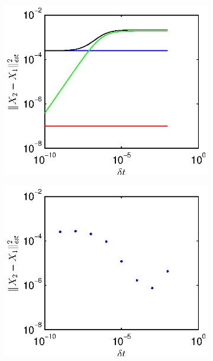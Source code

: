 \documentclass[1p]{elsarticle}
\begin{document}
\begin{figure}[h]
\begin{subfigure}{0.5\textwidth}
\includegraphics[width=\textwidth]{errors_function_dt}
\caption{}
\end{subfigure}
\begin{subfigure}{0.5\textwidth}
\includegraphics[width=\textwidth]{empirical_totaldist_function_dt}
\caption{}
\end{subfigure}
\begin{subfigure}{0.5\textwidth}

\end{subfigure}
\end{figure}
\end{document}
